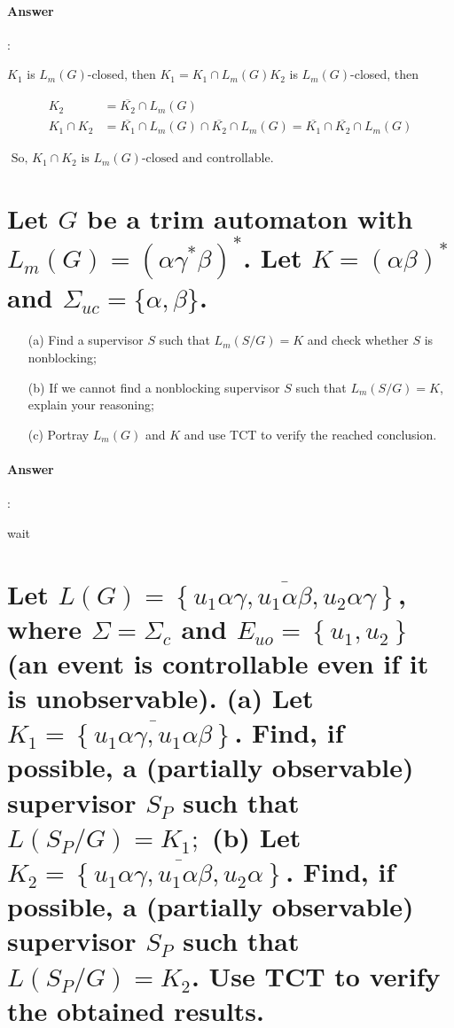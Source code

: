 \documentclass{article}
\begin{document}
\paragraph{Answer}:

$K_1$ is $L_m(G)$-closed, then $K_1=K_1 \cap L_m(G) K_2$ is $L_m(G)$-closed, then

\begin{equation*}
  \begin{aligned}
  K_2&=\overline{K_2} \cap L_m(G) \\
   K_1 \cap K_2&=\overline{K_1} \cap L_m(G) \cap \overline{K_2} \cap L_m(G)=\overline{K_1} \cap \overline{K_2} \cap L_m(G)
  \end{aligned}
\end{equation*}

$\text { So, } K_1 \cap K_2 \text { is } L_m(G) \text {-closed and controllable. }$

\section{Let $G$ be a trim automaton with $L_m(G)=\left(\alpha \gamma^* \beta\right)^*$. Let $K=(\alpha \beta)^*$ and $\Sigma_{u c}=\{\alpha, \beta\}$. }

\begin{enumerate}
  \item[(a)] Find a supervisor $S$ such that $L_m(S / G)=K$ and check whether $S$ is nonblocking;
  \item[(b)] If we cannot find a nonblocking supervisor $S$ such that $L_m(S / G)=K$, explain your reasoning;
  \item[(c)] Portray $L_m(G)$ and $K$ and use TCT to verify the reached conclusion.
\end{enumerate}

\paragraph{Answer}:

wait

\section{Let $L(G)=\overline{\left\{u_1 \alpha \gamma, u_1 \alpha \beta, u_2 \alpha \gamma\right\}}$, where $\Sigma=\Sigma_c$ and $E_{u o}=\left\{u_1, u_2\right\}$ (an event is controllable even if it is unobservable). (a) Let $K_1=\overline{\left\{u_1 \alpha \gamma, u_1 \alpha \beta\right\}}$. Find, if possible, a (partially observable) supervisor $S_P$ such that $L\left(S_P / G\right)=K_1 ;$ (b) Let $K_2=\overline{\left\{u_1 \alpha \gamma, u_1 \alpha \beta, u_2 \alpha\right\}}$. Find, if possible, a (partially observable) supervisor $S_P$ such that $L\left(S_P / G\right)=K_2$. Use TCT to verify the obtained results.}
\end{document}
